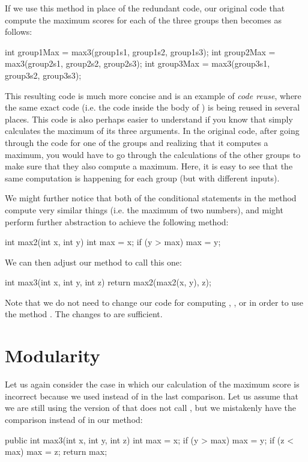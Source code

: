 If we use this method in place of the redundant code,
our original code that compute the maximum scores for each of the three
groups then becomes as follows:
\begin{code}
int group1Max = max3(group1s1, group1s2, group1s3);
int group2Max = max3(group2s1, group2s2, group2s3);
int group3Max = max3(group3s1, group3s2, group3s3);
\end{code}
This resulting code is much more concise and is an example
of \emph{code reuse}, where the same exact code
(i.e. the code inside the body of ) is being reused
in several places. This code is also perhaps easier to understand
if you know that  simply calculates the maximum
of its three arguments. In the original code, after
going through the code for one of the groups
and realizing that it computes a maximum, you
would have to go through the calculations of the other
groups to make sure that they also compute a maximum.
Here, it is easy to see that the same computation is happening
for each group (but with different inputs).

We might further notice that both of the conditional statements
in the  method
compute very similar things (i.e. the maximum of two numbers),
and might perform further abstraction to achieve the following
method:
\begin{code}
int max2(int x, int y) {
  int max = x;
  if (y > max) {
    max = y; 
  }
}
\end{code}

We can then adjust our  method to call this one:
\begin{code}
int max3(int x, int y, int z) {
  return max2(max2(x, y), z);
}
\end{code}

Note that we do not need to change our code
for computing , ,
or  in order to use the method
. The changes to  are sufficient.

\section{Modularity}
Let us again consider the case in which our calculation of the maximum
score is incorrect because we used \ic{<} instead of \ic{>} in
the last comparison. Let us assume that we are still using the
version of  that does not call , but
we mistakenly have the comparison  instead of
 in our method:
\begin{code}
public int max3(int x, int y, int z) {
  int max = x;
  if (y > max) {
    max = y;
  }
  if (z < max) {
    max = z;
  }
  return max;
}
\end{code}

